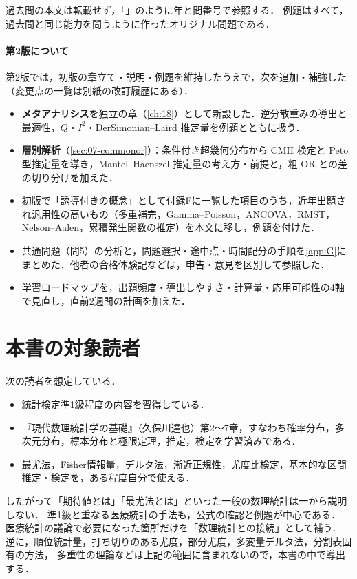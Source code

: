 過去問の本文は転載せず，「」のように年と問番号で参照する．
例題はすべて，過去問と同じ能力を問うように作ったオリジナル問題である．

\paragraph{第2版について}
第2版では，初版の章立て・説明・例題を維持したうえで，次を追加・補強した（変更点の一覧は別紙の改訂履歴にある）．
\begin{itemize}
\item \textbf{メタアナリシス}を独立の章（\cref{ch:18}）として新設した．逆分散重みの導出と最適性，$Q$・$I^2$・DerSimonian--Laird 推定量を例題とともに扱う．
\item \textbf{層別解析}（\cref{sec:07-commonor}）：条件付き超幾何分布から CMH 検定と Peto 型推定量を導き，Mantel--Haenszel 推定量の考え方・前提と，粗 OR との差の切り分けを加えた．
\item 初版で「誘導付きの概念」として付録Fに一覧した項目のうち，近年出題され汎用性の高いもの（多重補完，Gamma--Poisson，ANCOVA，RMST，Nelson--Aalen，累積発生関数の推定）を本文に移し，例題を付けた．
\item 共通問題（問5）の分析と，問題選択・途中点・時間配分の手順を\cref{app:G}にまとめた．他者の合格体験記などは，申告・意見を区別して参照した．
\item 学習ロードマップを，出題頻度・導出しやすさ・計算量・応用可能性の4軸で見直し，直前2週間の計画を加えた．
\end{itemize}

\section*{本書の対象読者}
次の読者を想定している．
\begin{itemize}
\item 統計検定準1級程度の内容を習得している．
\item 『現代数理統計学の基礎』（久保川達也）第2〜7章，すなわち確率分布，多次元分布，標本分布と極限定理，推定，検定を学習済みである．
\item 最尤法，Fisher情報量，デルタ法，漸近正規性，尤度比検定，基本的な区間推定・検定を，ある程度自分で使える．
\end{itemize}
したがって「期待値とは」「最尤法とは」といった一般の数理統計は一から説明しない．
準1級と重なる医療統計の手法も，公式の確認と例題が中心である．
医療統計の議論で必要になった箇所だけを「数理統計との接続」として補う．
逆に，順位統計量，打ち切りのある尤度，部分尤度，多変量デルタ法，分割表固有の方法，
多重性の理論などは上記の範囲に含まれないので，本書の中で導出する．

